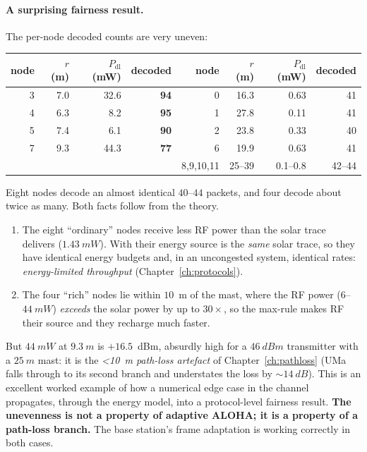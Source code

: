 \paragraph{A surprising fairness result.}
The per-node decoded counts are very uneven:
\begin{center}
\small
\renewcommand{\arraystretch}{1.1}
\begin{tabular}{@{}rrrr|rrrr@{}}
\toprule
node & $r$ (m) & $P_{\mathrm{dl}}$ (mW) & decoded & node & $r$ (m) & $P_{\mathrm{dl}}$ (mW) & decoded\\
\midrule
 3 & 7.0 & 32.6 & \textbf{94} &  0 & 16.3 & 0.63 & 41\\
 4 & 6.3 & 8.2 & \textbf{95} &  1 & 27.8 & 0.11 & 41\\
 5 & 7.4 & 6.1 & \textbf{90} &  2 & 23.8 & 0.33 & 40\\
 7 & 9.3 & 44.3 & \textbf{77} &  6 & 19.9 & 0.63 & 41\\
 \multicolumn{4}{c|}{} & 8,9,10,11 & 25--39 & 0.1--0.8 & 42--44\\
\bottomrule
\end{tabular}
\end{center}
Eight nodes decode an almost identical $40$--$44$ packets, and four decode about twice as many. Both facts follow from the theory.
\begin{enumerate}
 \item The eight ``ordinary'' nodes receive less RF power than the solar trace delivers ($\SI{1.43}{mW}$). With  their energy source is the \emph{same} solar trace, so they have identical energy budgets and, in an uncongested system, identical rates: \emph{energy-limited throughput} (Chapter~\ref{ch:protocols}).
 \item The four ``rich'' nodes lie within $10$~m of the mast, where the RF power ($6$--$\SI{44}{mW}$) \emph{exceeds} the solar power by up to $30\times$, so the max-rule makes RF their source and they recharge much faster.
\end{enumerate}
But $\SI{44}{mW}$ at $\SI{9.3}{m}$ is $+16.5$~dBm, absurdly high for a $\SI{46}{dBm}$ transmitter with a $\SI{25}{m}$ mast: it is the \emph{\textless{}10~m path-loss artefact} of Chapter~\ref{ch:pathloss} (UMa falls through to its second branch and understates the loss by $\sim\SI{14}{dB}$). This is an excellent worked example of how a numerical edge case in the channel propagates, through the energy model, into a protocol-level fairness result. \textbf{The unevenness is not a property of adaptive ALOHA; it is a property of a path-loss branch.} The base station's frame adaptation is working correctly in both cases.

